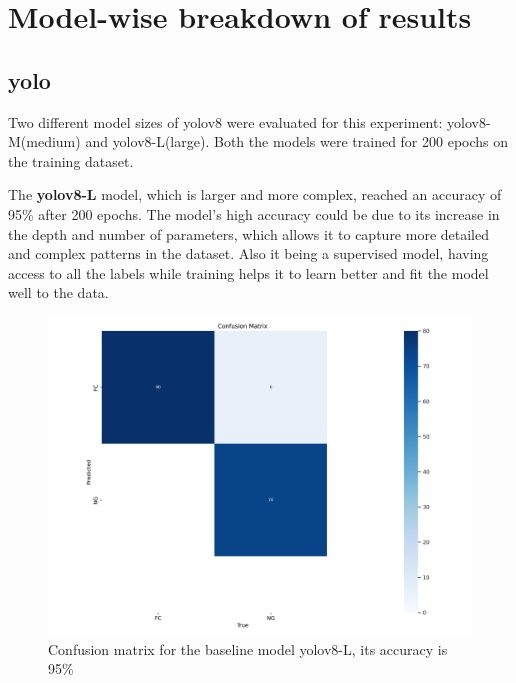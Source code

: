 \section{Model-wise breakdown of results}

\subsection*{\gls{yolo}}

Two different model sizes of \gls{yolo}v8 \cite{Ultralytics2024} were evaluated for this experiment: \gls{yolo}v8-M(medium) and \gls{yolo}v8-L(large). Both the models were trained for 200 epochs on the training dataset.

The \textbf{\gls{yolo}v8-L} model, which is larger and more complex, reached an accuracy of 95\% after 200 epochs. The model's high accuracy could be due to its increase in the depth and number of parameters, which allows it to capture more detailed and complex patterns in the dataset. Also it being a supervised model, having access to all the labels while training helps it to learn better and fit the model well to the data.

\begin{figure}[ht!]
    \centering
    \includegraphics[width=1.3\linewidth]{Rohit_Master_Thesis//Images/yolov8l_confusion_matrix.png}
    \caption{Confusion matrix for the baseline model \gls{yolo}v8-L, its accuracy is 95\%}
    \label{fig:yolov8l confusion matrix}
\end{figure}

